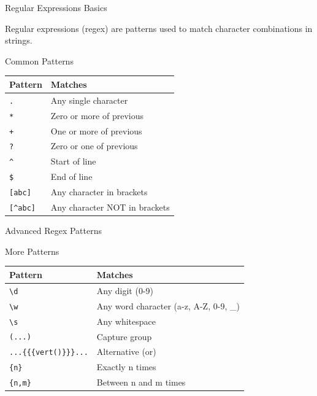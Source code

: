 \documentclass[presentation,aspectratio=1610]{beamer}
\begin{document}
\begin{frame}[label={sec:orgeaddb32},fragile]{Regular Expressions Basics}
 \begin{definition}\label{sec:orgff09206}
Regular expressions (regex) are patterns used to match character combinations in strings.
\end{definition}
\begin{block}{Common Patterns}
\begin{center}
\begin{tabular}{ll}
Pattern & Matches\\
\hline
\texttt{.} & Any single character\\
\texttt{*} & Zero or more of previous\\
\texttt{+} & One or more of previous\\
\texttt{?} & Zero or one of previous\\
\texttt{\textasciicircum{}} & Start of line\\
\texttt{\$} & End of line\\
\texttt{[abc]} & Any character in brackets\\
\texttt{[\textasciicircum{}abc]} & Any character NOT in brackets\\
\end{tabular}
\end{center}
\end{block}
\end{frame}
\begin{frame}[label={sec:orgd14ea94},fragile]{Advanced Regex Patterns}
 \begin{block}{More Patterns}
\begin{center}
\begin{tabular}{ll}
Pattern & Matches\\
\hline
\texttt{\textbackslash{}d} & Any digit (0-9)\\
\texttt{\textbackslash{}w} & Any word character (a-z, A-Z, 0-9, \_)\\
\texttt{\textbackslash{}s} & Any whitespace\\
\texttt{(...)} & Capture group\\
\texttt{...\{\{\{vert()\}\}\}...} & Alternative (or)\\
\texttt{\{n\}} & Exactly n times\\
\texttt{\{n,m\}} & Between n and m times\\
\end{tabular}
\end{center}
\end{block}
\end{frame}
\end{document}
